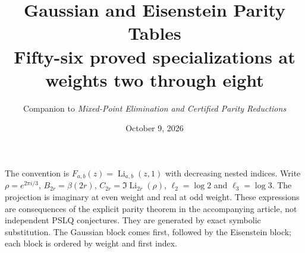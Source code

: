 \documentclass[11pt]{article}
\title{Gaussian and Eisenstein Parity Tables\\\large Fifty-six proved specializations at weights two through eight}
\author{Companion to \emph{Mixed-Point Elimination and Certified Parity Reductions}}
\date{October 9, 2026}
\begin{document}
\maketitle
The convention is $F_{a,b}(z)=\operatorname{Li}_{a,b}(z,1)$ with decreasing nested indices.
Write $\rho=e^{2\pi i/3}$,
$B_{2r}=\beta(2r)$, $C_{2r}=\Im\operatorname{Li}_{2r}(\rho)$,
$\ell_2=\log2$ and $\ell_3=\log3$.
The projection is imaginary at even weight and real at odd weight.
These expressions are consequences of the explicit parity theorem in the accompanying article,
not independent PSLQ conjectures. They are generated by exact symbolic substitution.
The Gaussian block comes first, followed by the Eisenstein block; each block is ordered by weight and first index.

\end{document}
